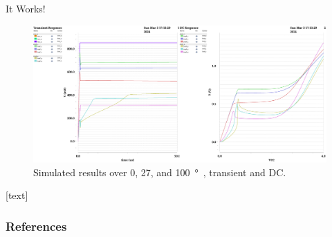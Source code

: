 \documentclass[aspectratio=1610]{beamer} %
\begin{document}
\begin{frame}{It Works!}{}
    \begin{figure}[!t]
        \centering
        \includegraphics[height=0.7\textheight]{bandgap_temp.eps}
        \caption{Simulated results over 0, 27, and \qty{100}{\degree\C}, transient and DC.}\label{fig:gpdk_results_temp}
    \end{figure}
\end{frame}

\begin{frame}[allowframebreaks]
    [text]
    \frametitle{References}
    \footnotesize
    
    
    \footnotesize
\end{frame}
\end{document}
